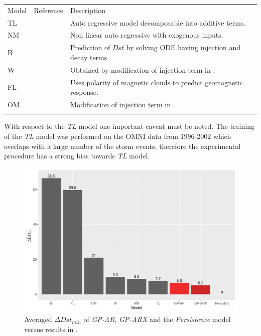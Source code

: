 \documentclass[referee,a4paper,12pt,traditabstract]{swsc}
\begin{document}
\begin{linenumbers}
\begin{table}
         \begin{tabular}{lll}
            \hline
            \noalign{\smallskip}
            Model  &  Reference  &  Description \\
            \noalign{\smallskip}
            \hline
            \noalign{\smallskip}
            TL & \citet{JGRA:JGRA16300} & Auto regressive model decomposable into additive terms.      \\
            NM & \citet{balikhin:narmax} & Non linear auto regressive with exogenous inputs. \\
            B & \citet{JGR:JGR10260} & Prediction of $Dst$ by solving ODE having injection and decay terms. \\
            W & \citet{Wang:Dst} & Obtained by modification of injection term in \citet{JGR:JGR10260}. \\
            FL & \citet{GRL:GRL11549} & Uses polarity of magnetic clouds to predict geomagnetic response.\\
            OM & \citet{JGRA:JGRA14856} & Modification of injection term in \citet{JGR:JGR10260}.\\
            \noalign{\smallskip}
            \hline
         \end{tabular}
\end{table}

With respect to the \emph{TL} model one important caveat must be noted. The training of the \emph{TL} model was performed on the OMNI data from 1996-2002 which overlaps with a large number of the storm events, therefore the experimental procedure has a strong bias towards \emph{TL} model.

\begin{figure}
   \centering
   \includegraphics[width=\textwidth]{Compare_deltaDst.png}
      \caption{Averaged $\Delta Dst_{min}$ of \emph{GP-AR}, \emph{GP-ARX} and the \emph{Persistence} model versus results in \citet{Ji2012}.}
         \label{fig:deltaDst}
   \end{figure}


\end{linenumbers}
\end{document}
